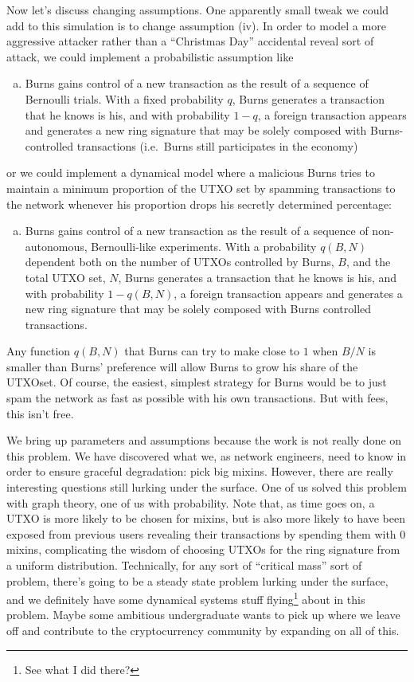 \documentclass{mrl}
\begin{document}
Now let's discuss changing assumptions. One apparently small tweak we could add to this simulation is to change assumption (iv). In order to model a more aggressive attacker rather than a ``Christmas Day'' accidental reveal sort of attack, we could implement a probabilistic assumption like
\begin{enumerate}[(v)]
\item Burns gains control of a new transaction as the result of a sequence of Bernoulli trials. With a fixed probability $q$, Burns generates a transaction that he knows is his, and with probability $1-q$, a foreign transaction appears and generates a new ring signature that may be solely composed with Burns-controlled transactions (i.e.\ Burns still participates in the economy)
\end{enumerate}
or we could implement a dynamical model where a malicious Burns tries to maintain a minimum proportion of the UTXO set by spamming transactions to the network whenever his proportion drops his secretly determined percentage:
\begin{enumerate}[(v)]
\item Burns gains control of a new transaction as the result of a sequence of non-autonomous, Bernoulli-like experiments. With a probability $q(B,N)$ dependent both on the number of UTXOs controlled by Burns, $B$, and the total UTXO set, $N$, Burns generates a transaction that he knows is his, and with probability $1-q(B,N)$, a foreign transaction appears and generates a new ring signature that may be solely composed with Burns controlled transactions.
\end{enumerate}
Any function $q(B,N)$ that Burns can try to make close to $1$ when $B/N$ is smaller than Burns' preference will allow Burns to grow his share of the UTXOset. Of course, the easiest, simplest strategy for Burns would be to just spam the network as fast as possible with his own transactions. But with fees, this isn't free. 

We bring up parameters and assumptions because the work is not really done on this problem. We have discovered what we, as network engineers, need to know in order to ensure graceful degradation: pick big mixins. However, there are really interesting questions still lurking under the surface. One of us solved this problem with graph theory, one of us with probability. Note that, as time goes on, a UTXO is more likely to be chosen for mixins, but is also more likely to have been exposed from previous users revealing their transactions by spending them with $0$ mixins, complicating the wisdom of choosing UTXOs for the ring signature from a uniform distribution. Technically, for any sort of ``critical mass'' sort of problem, there's going to be a steady state problem lurking under the surface, and we definitely have some dynamical systems stuff flying\footnote{See what I did there?} about in this problem.  Maybe some ambitious undergraduate wants to pick up where we leave off and contribute to the cryptocurrency community by expanding on all of this.

\begin{backmatter}
\end{backmatter}
\end{document}
